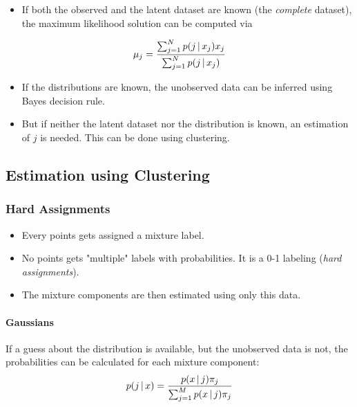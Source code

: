 					\begin{itemize}
						\item If both the observed and the latent dataset are known (the \emph{complete} dataset), the maximum likelihood solution can be computed via
					\end{itemize}
					\begin{equation}
						\mu_j = \frac{\sum_{j = 1}^{N} p(j \,\vert\, x_j) x_j}{\sum_{j = 1}^{N} p(j \,\vert\, x_j)}
					\end{equation}
					\begin{itemize}
						\item If the distributions are known, the unobserved data can be inferred using Bayes decision rule.
						\item But if neither the latent dataset nor the distribution is known, an estimation of \(j\) is needed. This can be done using clustering.
					\end{itemize}

		\subsection{Estimation using Clustering}
			\subsubsection{Hard Assignments}
				\begin{itemize}
					\item Every points gets assigned a mixture label.
					\item No points gets "multiple" labels with probabilities. It is a 0-1 labeling (\emph{hard assignments}).
					\item The mixture components are then estimated using only this data.
				\end{itemize}

				\paragraph{Gaussians}
					If a guess about the distribution is available, but the unobserved data is not, the probabilities can be calculated for each mixture component:
					\begin{equation}
						p(j \,\vert\, x) = \frac{p(x \,\vert\, j) \pi_j}{\sum_{j = 1}^{M} p(x \,\vert\, j) \pi_j}
					\end{equation}

